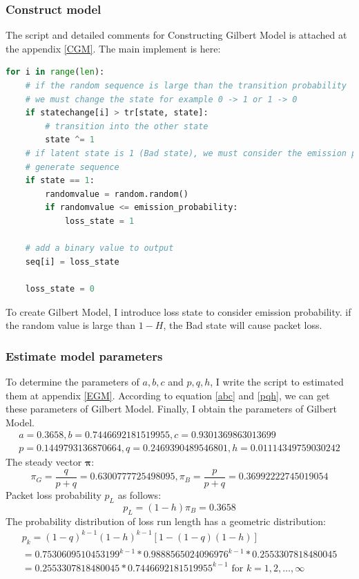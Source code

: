 \documentclass[11pt]{article}
\begin{document}
\subsubsection{Construct model}
The script and detailed comments for Constructing Gilbert Model is attached at the appendix \ref{CGM}.  The main implement is here:
\begin{lstlisting}[language=Python]
    for i in range(len):
    # if the random sequence is large than the transition probability
    # we must change the state for example 0 -> 1 or 1 -> 0
    if statechange[i] > tr[state, state]:
        # transition into the other state
        state ^= 1
    # if latent state is 1 (Bad state), we must consider the emission probability to
    # generate sequence
    if state == 1:
        randomvalue = random.random()
        if randomvalue <= emission_probability:
            loss_state = 1

    # add a binary value to output
    seq[i] = loss_state

    loss_state = 0
\end{lstlisting}
To create Gilbert Model, I introduce loss state to consider emission probability. if the random value is large than $1-H$, the Bad state will cause packet loss.
\subsubsection{Estimate model parameters}
To determine the parameters of $a,b,c$ and $p,q,h$, I write the script to estimated them at appendix \ref{EGM}.
According to equation \ref{abc} and \ref{pqh}, we can get these parameters of Gilbert Model.
Finally, I obtain the parameters of Gilbert Model.
\begin{equation}
    \begin{array}{lr}
        a=0.3658,
        b=0.7446692181519955,
        c=0.9301369863013699\\
        p=0.1449793136870664,
        q=0.2469390489546801,
        h=0.01114349759030242
    \end{array}
\end{equation}
The steady vector $\boldsymbol{\pi}$:
\begin{equation}
    \pi_G = \frac{q}{p+q} = 0.6300777725498095, \pi_B = \frac{p}{p+q} = 0.36992222745019054
\end{equation}
Packet loss probability $p_L$ as follows:
\begin{equation}
    p_L = (1-h)\pi_B = 0.3658
\end{equation}
The probability distribution of loss run length has a geometric distribution:
\begin{equation}
    \begin{array}{lr}
        p_{k} =(1-q)^{k-1}(1-h)^{k-1}[1-(1-q)(1-h)] 
        \\=0.7530609510453199 ^{k-1}*0.9888565024096976^{k-1}*0.2553307818480045
        \\= 0.2553307818480045 * 0.7446692181519955^{k-1}
        \text { for } k=1,2, \ldots, \infty \label{distributionofSGM}
    \end{array}
\end{equation}
\end{document}
